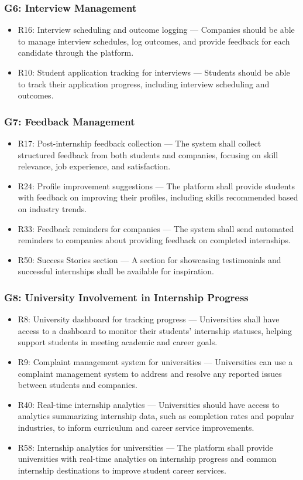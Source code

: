 \subsubsection{G6: Interview Management}
\begin{itemize}
    \item R16: Interview scheduling and outcome logging — Companies should be able to manage interview schedules, log outcomes, and provide feedback for each candidate through the platform.
    \item R10: Student application tracking for interviews — Students should be able to track their application progress, including interview scheduling and outcomes.
\end{itemize}

\subsubsection{G7: Feedback Management}
\begin{itemize}
    \item R17: Post-internship feedback collection — The system shall collect structured feedback from both students and companies, focusing on skill relevance, job experience, and satisfaction.
    \item R24: Profile improvement suggestions — The platform shall provide students with feedback on improving their profiles, including skills recommended based on industry trends.
    \item R33: Feedback reminders for companies — The system shall send automated reminders to companies about providing feedback on completed internships.
    \item R50: Success Stories section — A section for showcasing testimonials and successful internships shall be available for inspiration.
\end{itemize}

\subsubsection{G8: University Involvement in Internship Progress}
\begin{itemize}
    \item R8: University dashboard for tracking progress — Universities shall have access to a dashboard to monitor their students' internship statuses, helping support students in meeting academic and career goals.
    \item R9: Complaint management system for universities — Universities can use a complaint management system to address and resolve any reported issues between students and companies.
    \item R40: Real-time internship analytics — Universities should have access to analytics summarizing internship data, such as completion rates and popular industries, to inform curriculum and career service improvements.
    \item R58: Internship analytics for universities — The platform shall provide universities with real-time analytics on internship progress and common internship destinations to improve student career services.
\end{itemize}



